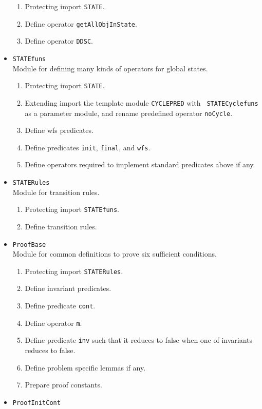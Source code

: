 \documentclass[12pt]{report}
\begin{document}
\begin{itemize}
  \begin{enumerate}
  \item Protecting import {\tt STATE}.
  \item Define operator {\tt getAllObjInState}.
  \item Define operator {\tt DDSC}.
  \end{enumerate}
\item {\tt STATEfuns}\\
  Module for defining many kinds of operators for global states.
  \begin{enumerate}
  \item Protecting import {\tt STATE}.
  \item Extending import the template module {\tt CYCLEPRED} with {\tt
    STATECyclefuns} as a parameter module, and rename predefined
    operator {\tt noCycle}.
  \item Define wfs predicates.
  \item Define predicates {\tt init}, {\tt final}, and {\tt wfs}.
  \item Define operators required to implement standard predicates
    above if any.
  \end{enumerate}
\item {\tt STATERules}\\
  Module for transition rules.
  \begin{enumerate}
  \item Protecting import {\tt STATEfuns}.
  \item Define transition rules.
  \end{enumerate}
\item {\tt ProofBase}\\
  Module for common definitions to prove six sufficient conditions.
  \begin{enumerate}
  \item Protecting import {\tt STATERules}.
  \item Define invariant predicates.
  \item Define predicate {\tt cont}.
  \item Define operator {\tt m}.
  \item Define predicate {\tt inv} such that it reduces to false when
    one of invariants reduces to false.
  \item Define problem specific lemmas if any.
  \item Prepare proof constants.
  \end{enumerate}
\item {\tt ProofInitCont}\\

\end{itemize}
\end{document}

